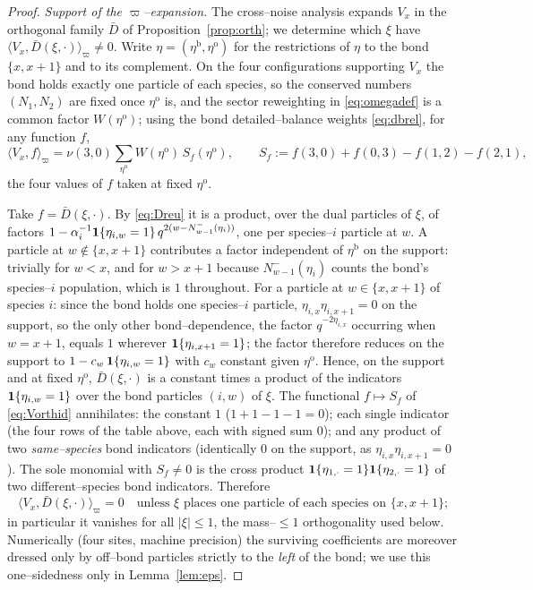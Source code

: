\documentclass[11pt]{article}
\theoremstyle{plain}
\theoremstyle{definition}
\theoremstyle{remark}
\begin{document}
\begin{proof}
\emph{Support of the $\varpi$--expansion.} The cross--noise analysis expands $V_x$ in the
orthogonal family $\bar D$ of Proposition~\ref{prop:orth}; we determine which $\xi$ have
$\langle V_x,\bar D(\xi,\cdot)\rangle_\varpi\ne0$. Write
$\eta=(\eta^{\mathrm b},\eta^{\mathrm o})$ for the restrictions of $\eta$ to the bond
$\{x,x+1\}$ and to its complement. On the four configurations supporting $V_x$ the bond
holds exactly one particle of each species, so the conserved numbers $(N_1,N_2)$ are
fixed once $\eta^{\mathrm o}$ is, and the sector reweighting in \eqref{eq:omegadef} is a
common factor $W(\eta^{\mathrm o})$; using the bond detailed--balance weights
\eqref{eq:dbrel}, for any function $f$,
\begin{equation}\label{eq:Vorthid}
  \langle V_x,f\rangle_\varpi=\nu(3,0)\sum_{\eta^{\mathrm o}}W(\eta^{\mathrm o})\,
  S_f(\eta^{\mathrm o}),\qquad
  S_f:=f(3,0)+f(0,3)-f(1,2)-f(2,1),
\end{equation}
the four values of $f$ taken at fixed $\eta^{\mathrm o}$.

Take $f=\bar D(\xi,\cdot)$. By \eqref{eq:Dreu} it is a product, over the dual particles of
$\xi$, of factors $1-\alpha_i^{-1}\mathbf 1\{\eta_{i,w}=1\}\,q^{2(w-N^-_{w-1}(\eta_i))}$, one
per species--$i$ particle at $w$. A particle at $w\notin\{x,x+1\}$ contributes a factor
independent of $\eta^{\mathrm b}$ on the support: trivially for $w<x$, and for $w>x+1$
because $N^-_{w-1}(\eta_i)$ counts the bond's species--$i$ population, which is $1$
throughout. For a particle at $w\in\{x,x+1\}$ of species $i$: since the bond holds one
species--$i$ particle, $\eta_{i,x}\eta_{i,x+1}=0$ on the support, so the only other
bond--dependence, the factor $q^{-2\eta_{i,x}}$ occurring when $w=x+1$, equals $1$
wherever $\mathbf 1\{\eta_{i,x+1}=1\}$; the factor therefore reduces on the support to
$1-c_w\,\mathbf 1\{\eta_{i,w}=1\}$ with $c_w$ constant given $\eta^{\mathrm o}$. Hence, on the
support and at fixed $\eta^{\mathrm o}$, $\bar D(\xi,\cdot)$ is a constant times a product
of the indicators $\mathbf 1\{\eta_{i,w}=1\}$ over the bond particles $(i,w)$ of $\xi$.
The functional $f\mapsto S_f$ of \eqref{eq:Vorthid} annihilates: the constant $1$
($1+1-1-1=0$); each single indicator (the four rows of the table above, each with signed
sum $0$); and any product of two \emph{same--species} bond indicators (identically $0$ on
the support, as $\eta_{i,x}\eta_{i,x+1}=0$). The sole monomial with $S_f\ne0$ is the
cross product $\mathbf 1\{\eta_{1,\cdot}=1\}\mathbf 1\{\eta_{2,\cdot}=1\}$ of two
different--species bond indicators. Therefore
\[
  \langle V_x,\bar D(\xi,\cdot)\rangle_\varpi=0
  \quad\text{unless $\xi$ places one particle of each species on $\{x,x+1\}$;}
\]
in particular it vanishes for all $|\xi|\le1$, the mass--$\le1$ orthogonality used below.
Numerically (four sites, machine precision) the surviving coefficients are moreover
dressed only by off--bond particles strictly to the \emph{left} of the bond; we use this
one--sidedness only in Lemma~\ref{lem:eps}.
\end{proof}
\end{document}
